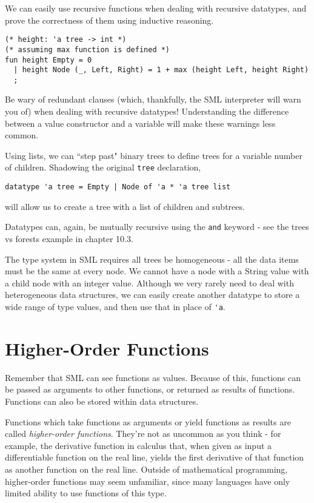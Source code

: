 \documentclass[11pt]{article}
\begin{document}
We can easily use recursive functions when dealing with recursive datatypes, and prove the correctness of them using inductive reasoning.

\begin{verbatim}
(* height: 'a tree -> int *)
(* assuming max function is defined *)
fun height Empty = 0
  | height Node (_, Left, Right) = 1 + max (height Left, height Right)
  ;
\end{verbatim}

Be wary of redundant clauses (which, thankfully, the SML interpreter will warn you of) when dealing with recursive datatypes! Understanding the difference between a value constructor and a variable will make these warnings less common.

Using lists, we can ``step past" binary trees to define trees for a variable number of children. Shadowing the original \verb~tree~ declaration, 

\verb~datatype 'a tree = Empty | Node of 'a * 'a tree list~

will allow us to create a tree with a list of children and subtrees.

Datatypes can, again, be mutually recursive using the \verb~and~ keyword - see the trees vs forests example in chapter 10.3.

The type system in SML requires all trees be homogeneous - all the data items must be the same at every node. We cannot have a node with a String value with a child node with an integer value. Although we very rarely need to deal with heterogeneous data structures, we can easily create another datatype to store a wide range of type values, and then use that in place of \verb~'a~.

\section{Higher-Order Functions}

Remember that SML can see functions as values. Because of this, functions can be passed as arguments to other functions, or returned as results of functions. Functions can also be stored within data structures.

Functions which take functions as arguments or yield functions as results are called \emph{higher-order functions}. They're not as uncommon as you think - for example, the derivative function in calculus that, when given as input a differentiable function on the real line, yields the first derivative of that function as another function on the real line. Outside of mathematical programming, higher-order functions may seem unfamiliar, since many languages have only limited ability to use functions of this type.
\end{document}
